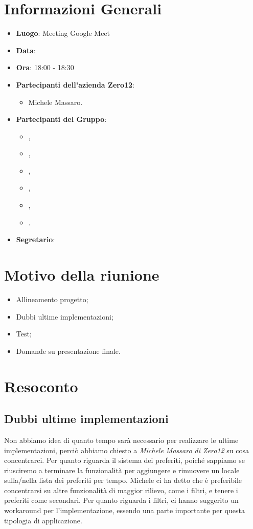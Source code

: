 \section{Informazioni Generali}

\begin{itemize}
\item{\textbf{Luogo}}: Meeting Google Meet
\item{\textbf{Data}}: \D
\item{\textbf{Ora}}: 18:00 - 18:30
\item{\textbf{Partecipanti dell'azienda Zero12}}: 
	\begin{itemize}
	\item{Michele Massaro.} 
	\end{itemize} 
\item{\textbf{Partecipanti del Gruppo}}: 
	\begin{itemize}
	\item{\EP{},} 
	\item{\FP{},}
	\item{\GC{},}
	\item{\LW{},}	
	\item{\MB{},}
	\item{\PV{}.}
	\end{itemize} 
\item{\textbf{Segretario}}: \PV{}
\end{itemize}

\section{Motivo della riunione}
\begin{itemize}
	\item {Allineamento progetto;}
	\item {Dubbi ultime implementazioni;}
 	\item {Test;}
  	\item {Domande su presentazione finale.}
\end{itemize}

\section{Resoconto}

\subsection{Dubbi ultime implementazioni}
Non abbiamo idea di quanto tempo sarà necessario per realizzare le ultime implementazioni, perciò abbiamo chiesto a \textit{Michele Massaro di Zero12} su cosa concentrarci. Per quanto riguarda il sistema dei preferiti, poiché sappiamo se riusciremo a terminare la funzionalità per aggiungere e rimuovere un locale sulla/nella lista dei preferiti per tempo. Michele ci ha detto che è preferibile concentrarsi su altre funzionalità di maggior rilievo, come i filtri, e tenere i preferiti come secondari. Per quanto riguarda i filtri, ci hanno suggerito un workaround per l'implementazione, essendo una parte importante per questa tipologia di applicazione.

